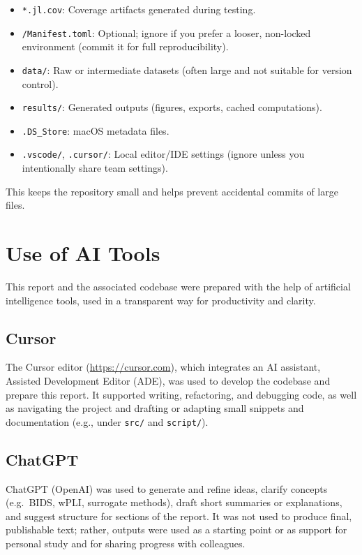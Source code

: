 \begin{tcolorbox}[
  enhanced,
  breakable,
  colback=black!1,
  colframe=black!40,
  boxrule=0.5pt,
  arc=1.5mm,
  title=\textbf{Pattern / path -> Why ignore it}
]
\footnotesize
\begin{itemize}[leftmargin=*,itemsep=2pt,topsep=2pt]
\item \texttt{*.jl.cov}: Coverage artifacts generated during testing.
\item \texttt{/Manifest.toml}: Optional; ignore if you prefer a looser, non-locked environment (commit it for full reproducibility).
\item \texttt{data/}: Raw or intermediate datasets (often large and not suitable for version control).
\item \texttt{results/}: Generated outputs (figures, exports, cached computations).
\item \texttt{.DS\_Store}: macOS metadata files.
\item \texttt{.vscode/}, \texttt{.cursor/}: Local editor/IDE settings (ignore unless you intentionally share team settings).
\end{itemize}
\end{tcolorbox}

This keeps the repository small and helps prevent accidental commits of large files.

\section{Use of AI Tools}

This report and the associated \Julia{} codebase were prepared with the help of artificial intelligence tools, used in a transparent way for productivity and clarity.

\subsection{Cursor}

The Cursor editor (\url{https://cursor.com}), which integrates an AI assistant, Assisted Development Editor (ADE), was used to develop the \Julia{} codebase and prepare this report. It supported writing, refactoring, and debugging code, as well as navigating the project and drafting or adapting small snippets and documentation (e.g., under \texttt{src/} and \texttt{script/}).

\subsection{ChatGPT}

ChatGPT (OpenAI) was used to generate and refine ideas, clarify concepts (e.g.\ BIDS, wPLI, surrogate methods), draft short summaries or explanations, and suggest structure for sections of the report. It was not used to produce final, publishable text; rather, outputs were used as a starting point or as support for personal study and for sharing progress with colleagues.

